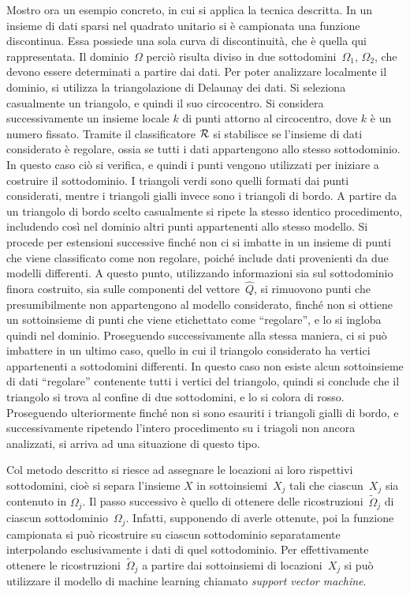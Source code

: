 Mostro ora un esempio concreto, in cui si applica la tecnica descritta.  In un insieme di dati sparsi nel quadrato unitario  si è campionata una funzione discontinua.  Essa possiede una sola curva di discontinuità, che è quella qui rappresentata.  Il dominio~$\Omega$ perciò risulta diviso in due sottodomini~$\Omega_1$, $\Omega_2$, che devono essere determinati a partire dai dati.
Per poter analizzare localmente il dominio, si utilizza la triangolazione di Delaunay dei dati.  Si seleziona casualmente un triangolo, e quindi il suo circocentro.   Si considera successivamente un insieme locale $k$ di punti attorno al circocentro, dove $k$ è un numero  fissato.  Tramite il classificatore $\cal R$ si stabilisce se l’insieme di dati considerato è regolare, ossia se tutti i dati appartengono allo stesso sottodominio.   In questo caso ciò si verifica, e quindi i punti vengono utilizzati per iniziare a costruire il sottodominio.  I triangoli verdi sono quelli formati dai punti considerati, mentre i triangoli gialli invece sono i triangoli di bordo.  A partire da un triangolo di bordo scelto casualmente si ripete la stesso identico procedimento, includendo così nel dominio altri punti appartenenti allo stesso modello.  Si procede per estensioni successive finché non ci si imbatte in un insieme di punti che viene classificato come non regolare, poiché include dati provenienti da due modelli differenti.  A questo punto, utilizzando informazioni sia sul sottodominio finora costruito, sia sulle componenti del vettore~$\widehat Q$, si rimuovono punti che presumibilmente non appartengono al modello considerato, finché non si ottiene un sottoinsieme di punti che viene etichettato come “regolare”, e lo si ingloba quindi nel dominio.  Proseguendo successivamente alla stessa maniera, ci si può imbattere in un ultimo caso, quello in cui il triangolo considerato ha vertici appartenenti  a sottodomini differenti.  In questo caso non esiste alcun sottoinsieme di dati “regolare” contenente tutti i vertici del triangolo, quindi si conclude che il triangolo si trova al confine di due sottodomini, e lo si colora di rosso.   Proseguendo ulteriormente finché non si sono esauriti i triangoli gialli di bordo, e successivamente ripetendo l’intero procedimento su i triagoli non ancora analizzati, si arriva ad una situazione di questo tipo.





Col metodo descritto si riesce ad assegnare le locazioni ai loro rispettivi sottodomini, cioè si separa l’insieme $X$ in sottoinsiemi~$X_j$ tali che ciascun~$X_j$ sia contenuto in $\Omega_j$.  Il passo successivo è quello di ottenere delle ricostruzioni~$\tilde\Omega_j$ di ciascun sottodominio~$\Omega_j$.  Infatti, supponendo di averle ottenute, poi la funzione campionata si può ricostruire su ciascun sottodominio separatamente interpolando esclusivamente i dati di quel sottodominio.
Per effettivamente ottenere le ricostruzioni~$\tilde\Omega_j$ a partire dai sottoinsiemi di locazioni~$X_j$ si può utilizzare il modello di machine learning chiamato {\em support vector machine}.



